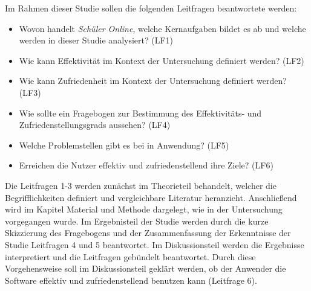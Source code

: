 Im Rahmen dieser Studie sollen die folgenden Leitfragen beantwortete werden: 
\begin{itemize}
    \item Wovon handelt \textit{Schüler Online}, welche Kernaufgaben bildet es ab und welche werden in dieser Studie analysiert? (LF1)%
    \item Wie kann Effektivität im Kontext der Untersuchung definiert werden? (LF2)%
    \item Wie kann Zufriedenheit im Kontext der Untersuchung definiert werden? (LF3)%
    \item Wie sollte ein Fragebogen zur Bestimmung des Effektivitäts- und Zufriedenstellungsgrads aussehen? (LF4)%
    \item Welche Problemstellen gibt es bei in Anwendung? (LF5)%
    \item Erreichen die Nutzer effektiv und zufriedenstellend ihre Ziele? (LF6)%
\end{itemize}

Die Leitfragen 1-3 werden zunächst im Theorieteil behandelt, welcher die Begrifflichkeiten definiert und vergleichbare Literatur heranzieht. Anschließend wird im Kapitel Material und Methode dargelegt, wie in der Untersuchung vorgegangen wurde. Im Ergebnisteil der Studie werden durch die kurze Skizzierung des Fragebogens und der Zusammenfassung der Erkenntnisse der Studie Leitfragen 4 und 5 beantwortet. Im Diskussionsteil werden die Ergebnisse interpretiert und die Leitfragen gebündelt beantwortet. Durch diese Vorgehensweise soll im Diskussionsteil geklärt werden, ob der Anwender die Software effektiv und zufriedenstellend benutzen kann (Leitfrage 6).

